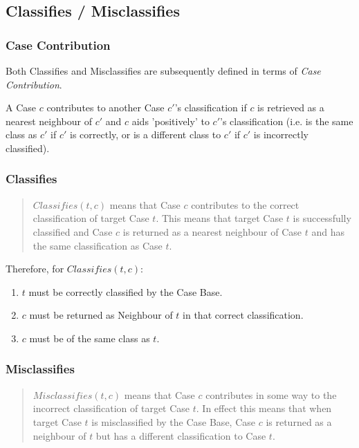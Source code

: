 \documentclass[a4paper,11pt]{report}
\begin{document}
\subsection{Classifies / Misclassifies}
\subsubsection{Case Contribution\label{sec:contributes}}
Both Classifies and Misclassifies are subsequently defined in terms of \emph{Case Contribution}.

A Case $c$ contributes to another Case $c'$'s classification if $c$ is retrieved as a nearest neighbour of $c'$ and $c$ aids 'positively' to $c'$'s classification (i.e. is the same class as $c'$ if $c'$ is correctly, or is a different class to  $c'$ if  $c'$ is incorrectly classified).
\subsubsection{Classifies}
\begin{quote}
$ Classifies(t, c) $ means that Case $c$ contributes to the correct classification of target Case $t$. This means that target Case $t$ is successfully classified and Case $c$ is returned as a nearest neighbour of Case $t$ and has the same classification as Case $t$\citep{Delany2009}.
\end{quote}

Therefore, for $ Classifies(t, c) $:
\begin{enumerate}
	\item $t$ must be correctly classified by the Case Base.
	\item $c$ must be returned as Neighbour of $t$ in that correct classification.
	\item $c$ must be of the same class as $t$.
\end{enumerate}

\subsubsection{Misclassifies}

\begin{quote}
$ Misclassifies(t, c ) $ means that Case $c$ contributes in some way to the incorrect classification of target Case $t$. In effect this means that when target Case $t$ is misclassified by the Case Base, Case $c$ is returned as a neighbour of $t$ but has a different classification to Case $t$\citep{Delany2009}.
\end{quote}
\end{document}
